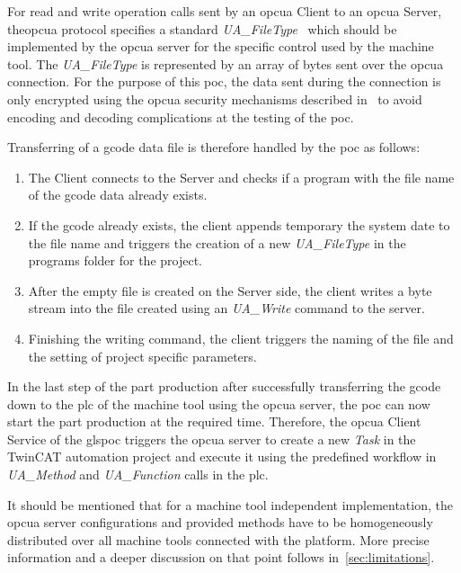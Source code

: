 \documentclass[
a4paper,
twoside,
headsepline,
cleardoublepage=empty,
parskip=half,
draft=false
]{scrbook}
\begin{document}
				For read and write operation calls sent by an \gls{opcua} Client to an \gls{opcua} Server, the\gls{opcua} protocol specifies a standard \textit{UA\_FileType}~\cite{opcfoundation2017part5} which should be implemented by the \gls{opcua} server for the specific control used by the machine tool. The \textit{UA\_FileType} is represented by an array of bytes sent over the \gls{opcua} connection. For the purpose of this \gls{poc}, the data sent during the connection is only encrypted using the \gls{opcua} security mechanisms described in~\cite{opcfoundation2017part1} to avoid encoding and decoding complications at the testing of the \gls{poc}.
				
				Transferring of a \gls{gcode} data file is therefore handled by the \gls{poc} as follows:

				\begin{enumerate}
					\item The Client connects to the Server and checks if a program with the file name of the \gls{gcode} data already exists.
					\item If the \gls{gcode} already exists, the client appends temporary the system date to the file name and triggers the creation of a new \textit{UA\_FileType} in the programs folder for the project.
					\item After the empty file is created on the Server side, the client writes a byte stream into the file created using an \textit{UA\_Write} command to the server.
					\item Finishing the writing command, the client triggers the naming of the file and the setting of project specific parameters.
				\end{enumerate}

				In the last step of the part production after successfully transferring the \gls{gcode} down to the \gls{plc} of the machine tool using the \gls{opcua} server, the \gls{poc} can now start the part production at the required time. 
				Therefore, the \gls{opcua} Client Service of the gls{poc} triggers the \gls{opcua} server to create a new \textit{Task} in the TwinCAT automation project and execute it using the predefined workflow in \textit{UA\_Method} and \textit{UA\_Function} calls in the \gls{plc}.

				It should be mentioned that for a machine tool independent implementation, the \gls{opcua} server configurations and provided methods have to be homogeneously distributed over all machine tools connected with the platform. More precise information and a deeper discussion on that point follows in~\cref{sec:limitations}.
\end{document}
